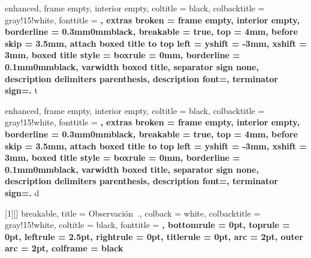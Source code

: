 \theoremstyle{definition}

\newtheorem{lemma}{Lema}[section]
\newtheorem{example}{Ejemplo}[section]
\newtheorem{theorem}{Teorema}[section]
\newtheorem{problem}{Problema}[section]
\newtheorem{property}{Propiedad}[section]
\newtheorem{exercise}{Ejercicio}[section]
\newtheorem{corollary}{Corolario}[section]
\newtheorem{definition}{Definición}[section]

\newtheorem*{note}{Nota}
\newtheorem*{hint}{Pista}


{
    enhanced,
    frame empty,
    interior empty,
    coltitle = black,
    colbacktitle = gray!15!white,
    fonttitle = \bfseries,
    extras broken = {frame empty, interior empty},
    borderline = {0.3mm}{0mm}{black},
    breakable = true,
    top = 4mm,
    before skip = 3.5mm,
    attach boxed title to top left = {yshift = -3mm, xshift = 3mm},
    boxed title style = {boxrule = 0mm, borderline = {0.1mm}{0mm}{black}},
    varwidth boxed title,
    separator sign none, description delimiters parenthesis,
    description font=\bfseries,
    terminator sign={.\hspace{1mm}}
}
{t}

{
    enhanced,
    frame empty,
    interior empty,
    coltitle = black,
    colbacktitle = gray!15!white,
    fonttitle = \bfseries,
    extras broken = {frame empty, interior empty},
    borderline = {0.3mm}{0mm}{black},
    breakable = true,
    top = 4mm,
    before skip = 3.5mm,
    attach boxed title to top left = {yshift = -3mm, xshift = 3mm},
    boxed title style = {boxrule = 0mm, borderline = {0.1mm}{0mm}{black}},
    varwidth boxed title,
    separator sign none, description delimiters parenthesis,
    description font=\bfseries,
    terminator sign={.\hspace{1mm}}
}
{d}


[1][]
{
    breakable,
    title = Observación~\thetcbcounter.,
    colback = white,
    colbacktitle = gray!15!white,
    coltitle = black,
    fonttitle = \bfseries,
    bottomrule = 0pt,
    toprule = 0pt,
    leftrule = 2.5pt,
    rightrule = 0pt,
    titlerule = 0pt,
    arc = 2pt,
    outer arc = 2pt,
    colframe = black
}